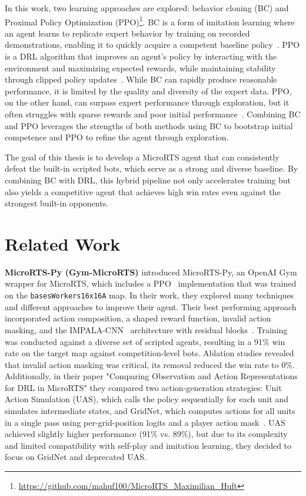 \documentclass[10pt,twocolumn,letterpaper]{article}
\begin{document}
In this work, two learning approaches are explored: behavior cloning (BC) and Proximal Policy Optimization (PPO)\footnote{\href{https://github.com/mahuf100/MicroRTS_Maximilian_Huft}{https://github.com/mahuf100/MicroRTS\_Maximilian\_Huft}}. BC is a form of imitation learning where an agent learns to replicate expert behavior by training on recorded demonstrations, enabling it to quickly acquire a competent baseline policy~\cite{torabi2018behavioral}. PPO is a DRL algorithm that improves an agent’s policy by interacting with the environment and maximizing expected rewards, while maintaining stability through clipped policy updates~\cite{schulman2017ppo}. While BC can rapidly produce reasonable performance, it is limited by the quality and diversity of the expert data. PPO, on the other hand, can surpass expert performance through exploration, but it often struggles with sparse rewards and poor initial performance~\cite{martin2021beclone}. Combining BC and PPO leverages the strengths of both methods using BC to bootstrap initial competence and PPO to refine the agent through exploration.

The goal of this thesis is to develop a MicroRTS agent that can consistently defeat the built-in scripted bots, which serve as a strong and diverse baseline. By combining BC with DRL, this hybrid pipeline not only accelerates training but also yields a competitive agent that achieves high win rates even against the strongest built-in opponents.


\section{Related Work}
\label{sec:related-work}

\noindent\textbf{MicroRTS-Py (Gym-MicroRTS)}  
\cite{huang2021gym} introduced MicroRTS-Py, an OpenAI Gym wrapper for MicroRTS, which includes a PPO~\cite{schulman2017ppo} implementation that was trained on the \texttt{basesWorkers16x16A} map. In their work, they explored many techniques and different approaches to improve their agent. Their best performing approach incorporated action composition, a shaped reward function, invalid action masking, and the IMPALA-CNN~\cite{espeholt2018impala} architecture with residual blocks~\cite{he2016deep}. Training was conducted against a diverse set of scripted agents, resulting in a 91\% win rate on the target map against competition-level bots.   Ablation studies revealed that invalid action masking was critical, its removal reduced the win rate to 0\%. Additionally, in their paper "Comparing Observation and Action Representations for DRL in MicroRTS" they compared two action-generation strategies: Unit Action Simulation (UAS), which calls the policy sequentially for each unit and simulates intermediate states, and GridNet, which computes actions for all units in a single pass using per-grid-position logits and a player action mask~\cite{huang2020observation}. UAS achieved slightly higher performance (91\% vs. 89\%), but due to its complexity and limited compatibility with self-play and imitation learning, they decided to focus on GridNet and deprecated UAS.
\end{document}
